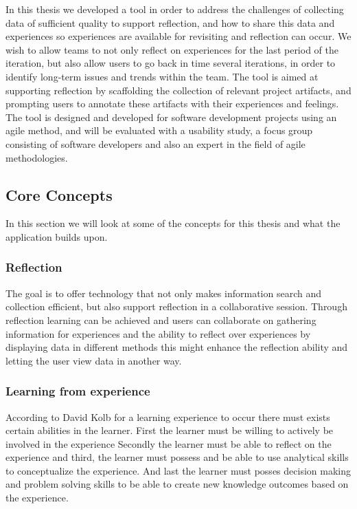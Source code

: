 In this thesis we developed a tool in order to address the challenges of collecting data of sufficient quality to support reflection, and how to share this data and experiences so experiences are available for revisiting and reflection can occur. We wish to allow teams to not only reflect on experiences for the last period of the iteration, but also allow users to go back in time several iterations, in order to identify long-term issues and trends within the team. The tool is aimed at supporting reflection by scaffolding the collection of relevant project artifacts, and prompting users to annotate these artifacts with their experiences and feelings. The tool is designed and developed for software development projects using an agile method, and will be evaluated with a usability study, a focus group consisting of software developers and also an expert in the field of agile methodologies. 

\subsection{Core Concepts}
In this section we will look at some of the concepts for this thesis and what the application builds upon. 

\subsubsection{Reflection}
The goal is to offer technology that not only makes information search and collection efficient, but also support reflection in a collaborative session. Through reflection learning can be achieved and users can collaborate on gathering information for experiences and the ability to reflect over experiences by displaying data in different methods this might enhance the reflection ability and letting the user view data in another way.

\subsubsection{Learning from experience}
According to David Kolb\citep{KolbModel} for a learning experience to occur there must exists certain abilities in the learner. First the learner must be willing to actively be involved in the experience Secondly the learner must be able to reflect on the experience and third, the learner must possess and be able to use analytical skills to conceptualize the experience. And last the learner must posses decision making and problem solving skills to be able to create new knowledge outcomes based on the experience.

